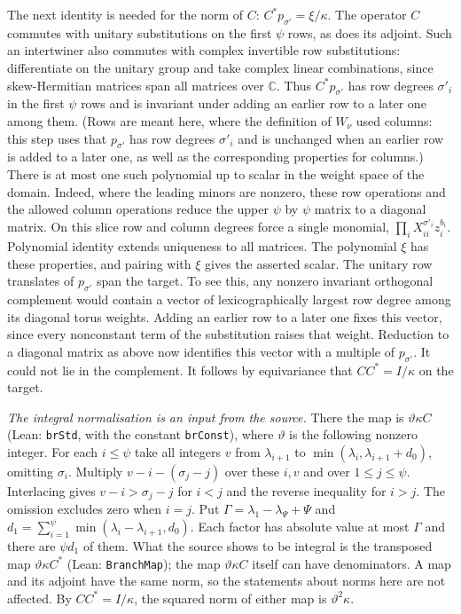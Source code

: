 \documentclass[11pt,letterpaper]{article}
\begin{document}
The next identity is needed for the norm of $C$: $C^*p_{\sigma'}=\xi/\kappa$.
The operator $C$ commutes with unitary substitutions on the first $\psi$
rows, as does its adjoint. Such an intertwiner also commutes with
complex invertible row substitutions: differentiate on the unitary
group and take complex linear combinations, since skew-Hermitian
matrices span all matrices over $\mathbb C$. Thus $C^*p_{\sigma'}$
has row degrees $\sigma'_i$ in the first $\psi$ rows and is invariant
under adding an earlier row to a later one among them. (Rows are meant here, where the definition of
$W_\nu$ used columns: this step uses that $p_{\sigma'}$ has row degrees $\sigma'_i$ and is unchanged when
an earlier row is added to a later one, as well as the corresponding properties for columns.) There is at most
one such polynomial up to scalar in the weight space of the domain. Indeed,
where the leading minors are nonzero, these row operations and the
allowed column operations reduce the upper $\psi$ by $\psi$ matrix to a
diagonal matrix. On this slice row and column degrees force a single
monomial, $\prod_i X_{ii}^{\sigma'_i}z_i^{b_i}$. Polynomial identity
extends uniqueness to all matrices. The polynomial $\xi$ has these
properties, and pairing with $\xi$ gives the asserted scalar.
The unitary row translates of $p_{\sigma'}$ span the target. To see
this, any nonzero invariant orthogonal complement would contain a
vector of lexicographically largest row degree among its diagonal
torus weights. Adding an earlier row to a later one fixes this vector,
since every nonconstant term of the substitution raises that weight.
Reduction to a diagonal matrix as above now identifies this vector
with a multiple of $p_{\sigma'}$. It could not lie in the complement.
It follows by equivariance that $CC^*=I/\kappa$ on the target.

\emph{The integral normalisation is an input from the source.} There the map is $\vartheta\kappa C$
(Lean: \texttt{brStd}, with the constant \texttt{brConst}),
where $\vartheta$ is the following nonzero integer. For each $i\le\psi$ take all
integers $v$ from $\lambda_{i+1}$ to
$\min(\lambda_i,\lambda_{i+1}+d_0)$, omitting $\sigma_i$.
Multiply $v-i-(\sigma_j-j)$ over these $i,v$ and over $1\le j\le\psi$.
Interlacing gives $v-i>\sigma_j-j$ for $i<j$ and the reverse inequality
for $i>j$. The omission excludes zero when $i=j$. Put
$\Gamma=\lambda_1-\lambda_\Psi+\Psi$ and
$d_1=\sum_{i=1}^\psi\min(\lambda_i-\lambda_{i+1},d_0)$.
Each factor has absolute value at most $\Gamma$ and there are $\psi d_1$ of them.
What the source shows to be integral is the transposed map $\vartheta\kappa C^*$ (Lean:
\texttt{BranchMap}); the map $\vartheta\kappa C$ itself can have denominators. A map and its adjoint have
the same norm, so the statements about norms here are not affected. By $CC^*=I/\kappa$, the squared norm
of either map is $\vartheta^2\kappa$.
\end{document}
